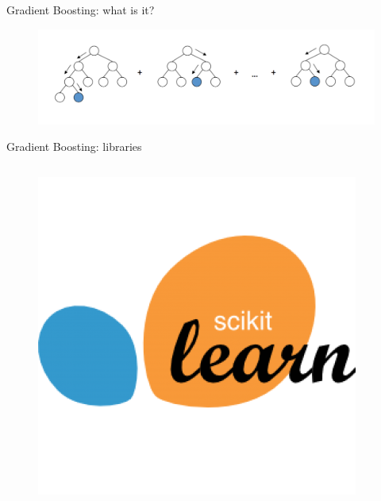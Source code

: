 \begin{frame}{Gradient Boosting: what is it?}
	\begin{figure}
		\includegraphics[width=\textwidth]{figures/gbdt}
	\end{figure}
\end{frame}

\begin{frame}{Gradient Boosting: libraries}
	\begin{columns}
		\begin{column}{0.33\textwidth}
			\centering
			\begin{figure}
				\includegraphics[width=\columnwidth]{figures/scikit}
			\end{figure}
		\end{column}


\end{columns}
\end{frame}
